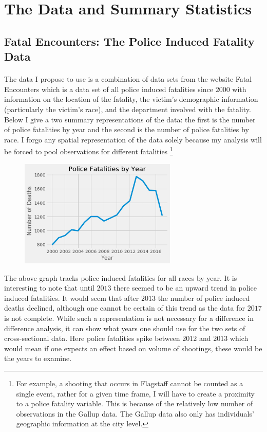 \documentclass{article}
\begin{document}
\section{The Data and Summary Statistics}

\subsection{Fatal Encounters: The Police Induced Fatality Data}

\paragraph{}The data I propose to use is a combination of data sets from the website Fatal Encounters which is a data set of all police induced fatalities since $2000$ with information on the location of the fatality, the victim's demographic information (particularly the victim's race), and the department involved with the fatality.  Below I give a two summary representations of the data: the first is the number of police fatalities by year and the second is the number of police fatalities by race. I forgo any spatial representation of the data solely because my analysis will be forced to pool observations for different fatalities \footnote{For example, a shooting that occurs in Flagstaff cannot be counted as a single event, rather for a given time frame, I will have to create a proximity to a police fatality variable. This is because of the relatively low number of observations in the Gallup data. The Gallup data also only has individuals' geographic information at the city level.}


\begin{figure}[h!]
\includegraphics[width=75mm,scale=0.1]{DeathToll.png}
\centering
\caption{}
\end{figure}

The above graph tracks police induced fatalities for all races by year. It is interesting to note that until $2013$ there seemed to be an upward trend in police induced fatalities. It would seem that after $2013$ the number of police induced deaths declined, although one cannot be certain of this trend as the data for $2017$ is not complete. While such a representation is not necessary for a difference in difference analysis, it can show what years one should use for the two sets of cross-sectional data. Here police fatalities spike between $2012$ and $2013$ which would mean if one expects an effect based on volume of shootings, these would be the years to examine. 
\end{document}
